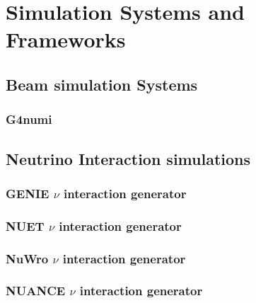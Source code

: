 %
\chapter{Simulation Systems and Frameworks}
\section{Beam simulation Systems}

\subsection{G4numi}


\section{Neutrino Interaction simulations}

\subsection{GENIE $\nu$ interaction generator}

\subsection{NUET $\nu$ interaction generator}

\subsection{NuWro $\nu$ interaction generator}

\subsection{NUANCE $\nu$ interaction generator}


